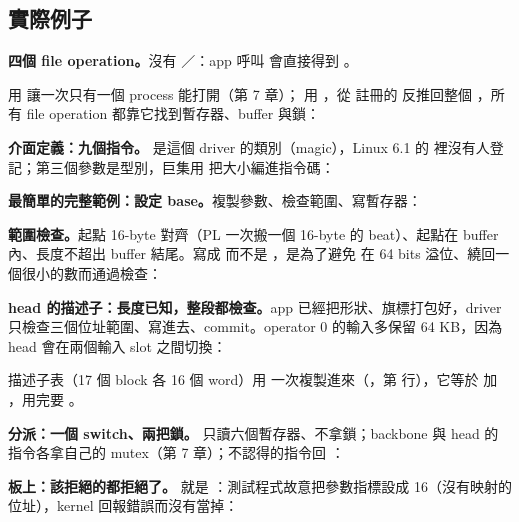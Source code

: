 \subsection{實際例子}

\textbf{四個 file operation。}沒有 ／：app 呼叫  會直接得到 。


 用  讓一次只有一個 process 能打開（第 7 章）； 用 ，從  註冊的  反推回整個 ，所有 file operation 都靠它找到暫存器、buffer 與鎖：


\textbf{介面定義：九個指令。} 是這個 driver 的類別（magic），Linux 6.1 的  裡沒有人登記；第三個參數是型別，巨集用  把大小編進指令碼：


\textbf{最簡單的完整範例：設定 base。}複製參數、檢查範圍、寫暫存器：


\textbf{範圍檢查。}起點 16-byte 對齊（PL 一次搬一個 16-byte 的 beat）、起點在 buffer 內、長度不超出 buffer 結尾。寫成  而不是 ，是為了避免  在 64 bits 溢位、繞回一個很小的數而通過檢查：


\textbf{head 的描述子：長度已知，整段都檢查。}app 已經把形狀、旗標打包好，driver 只檢查三個位址範圍、寫進去、commit。operator 0 的輸入多保留 64 KB，因為 head 會在兩個輸入 slot 之間切換：


描述子表（17 個 block 各 16 個 word）用  一次複製進來（，第  行），它等於  加 ，用完要 。

\textbf{分派：一個 switch、兩把鎖。} 只讀六個暫存器、不拿鎖；backbone 與 head 的指令各拿自己的 mutex（第 7 章）；不認得的指令回 ：


\textbf{板上：該拒絕的都拒絕了。} 就是 ：測試程式故意把參數指標設成 16（沒有映射的位址），kernel 回報錯誤而沒有當掉：

